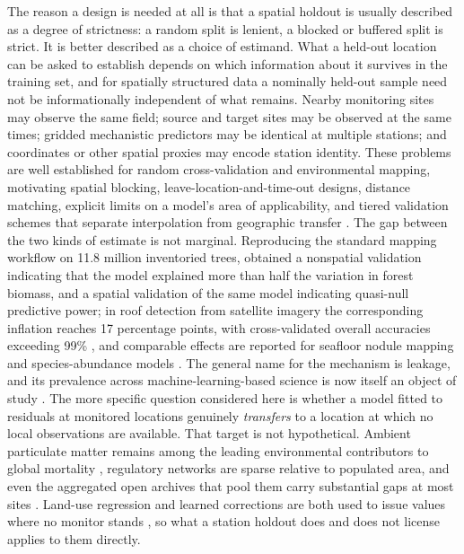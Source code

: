 The reason a design is needed at all is that a spatial holdout is usually described as a degree of strictness: a random split is lenient, a blocked or buffered split is strict. It is better described as a choice of estimand. What a held-out location can be asked to establish depends on which information about it survives in the training set, and for spatially structured data a nominally held-out sample need not be informationally independent of what remains. Nearby monitoring sites may observe the same field; source and target sites may be observed at the same times; gridded mechanistic predictors may be identical at multiple stations; and coordinates or other spatial proxies may encode station identity. These problems are well established for random cross-validation and environmental mapping, motivating spatial blocking, leave-location-and-time-out designs, distance matching, explicit limits on a model's area of applicability, and tiered validation schemes that separate interpolation from geographic transfer \citep{roberts2017,valavi2019blockcv,meyer2018llto,mila2022nndm,linnenbrink2024knndm,meyer2021aoa,jiang2026tiered,pohjankukka2017skcv}. The gap between the two kinds of estimate is not marginal. Reproducing the standard mapping workflow on 11.8 million inventoried trees, \citet{ploton2020} obtained a nonspatial validation indicating that the model explained more than half the variation in forest biomass, and a spatial validation of the same model indicating quasi-null predictive power; in roof detection from satellite imagery the corresponding inflation reaches 17 percentage points, with cross-validated overall accuracies exceeding 99\% \citep{abriha2023}, and comparable effects are reported for seafloor nodule mapping \citep{gazis2021} and species-abundance models \citep{mushagalusa2024}. The general name for the mechanism is leakage, and its prevalence across machine-learning-based science is now itself an object of study \citep{kapoor2023leakage,kapoor2024reforms}. The more specific question considered here is whether a model fitted to residuals at monitored locations genuinely \emph{transfers} to a location at which no local observations are available. That target is not hypothetical. Ambient particulate matter remains among the leading environmental contributors to global mortality \citep{cohen2017}, regulatory networks are sparse relative to populated area, and even the aggregated open archives that pool them carry substantial gaps at most sites \citep{tan2022openaq,rosales2025}. Land-use regression and learned corrections are both used to issue values where no monitor stands \citep{zhang2018lur,wang2025lur}, so what a station holdout does and does not license applies to them directly.

